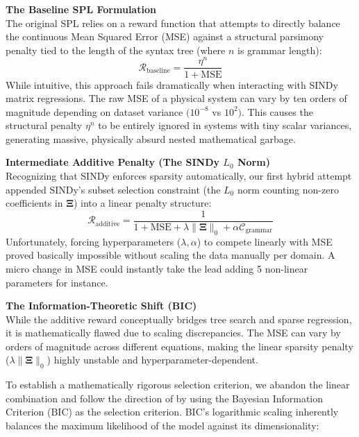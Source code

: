 \documentclass[11pt, a4paper]{article}
\begin{document}
\vspace{0.3cm}
\noindent \textbf{The Baseline SPL Formulation}\\
The original SPL \cite{sun2023spl} relies on a reward function that attempts to directly balance the continuous Mean Squared Error (MSE) against a structural parsimony penalty tied to the length of the syntax tree (where $n$ is grammar length):
\begin{equation}
    \mathcal{R}_{\text{baseline}} = \frac{\eta^n}{1 + \text{MSE}}
\end{equation}
While intuitive, this approach fails dramatically when interacting with SINDy matrix regressions. The raw MSE of a physical system can vary by ten orders of magnitude depending on dataset variance $(10^{-8}$ vs $10^2)$. This causes the structural penalty $\eta^n$ to be entirely ignored in systems with tiny scalar variances, generating massive, physically absurd nested mathematical garbage.

\vspace{0.3cm}
\noindent \textbf{Intermediate Additive Penalty (The SINDy $L_0$ Norm)}\\
Recognizing that SINDy enforces sparsity automatically, our first hybrid attempt appended SINDy's subset selection constraint (the $L_0$ norm counting non-zero coefficients in $\mathbf{\Xi}$) into a linear penalty structure:
\begin{equation}
    \mathcal{R}_{\text{additive}} = \frac{1}{1 + \text{MSE} + \lambda \|\mathbf{\Xi}\|_0 + \alpha \mathcal{C}_{\text{grammar}}}
\end{equation}
Unfortunately, forcing hyperparameters ($\lambda, \alpha$) to compete linearly with MSE proved basically impossible without scaling the data manually per domain. A micro change in MSE could instantly take the lead adding 5 non-linear parameters for instance.

\vspace{0.3cm}
\noindent \textbf{The Information-Theoretic Shift (BIC)}\\
While the additive reward conceptually bridges tree search and sparse regression, it is mathematically flawed due to scaling discrepancies. The MSE can vary by orders of magnitude across different equations, making the linear sparsity penalty ($\lambda \|\mathbf{\Xi}\|_0$) highly unstable and hyperparameter-dependent.

To establish a mathematically rigorous selection criterion, we abandon the linear combination and follow the direction of \cite{brunton2017BIC} by using the Bayesian Information Criterion (BIC) as the selection criterion. BIC's logarithmic scaling inherently balances the maximum likelihood of the model against its dimensionality:
\end{document}
